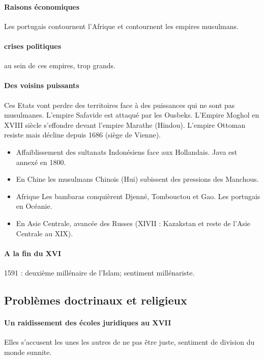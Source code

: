  
 
 \paragraph{Raisons économiques} Les portugais contournent l'Afrique et contournent les empires musulmans.  
 \paragraph{crises politiques} au sein de ces empires, trop grands. 
 \paragraph{Des voisins puissants} Ces Etats vont perdre des territoires face à des puissances qui ne sont pas musulmanes. L'empire Safavide est attaqué par les Ousbeks. L'Empire Moghol en XVIII siècle s'effondre devant l'empire Marathe (Hindou). L'empire Ottoman resiste mais décline depuis 1686 (siège de Vienne). 
 \begin{itemize}
     \item  {Affaiblissement des sultanats Indonésiens} face aux Hollandais. Java est annexé en 1800. 
  \item {En Chine} les musulmans Chinois (Hui) subissent des pressions des Manchous.
   \item  {Afrique} Les bambaras conquièrent Djenné, Tombouctou et Gao. Les portugais en Océanie. 
  \item {En Asie Centrale}, avancée des Russes (XIVII : Kazakstan et reste de l'Asie Centrale au XIX).
 \end{itemize}

 \paragraph{A la fin du XVI} 1591 : deuxième millénaire de l'Islam; sentiment millénariste. 
 
 
 
\subsection{Problèmes doctrinaux et religieux}

\paragraph{Un raidissement des écoles juridiques au XVII}
Elles s'accusent les unes les autres de ne pas être juste, sentiment de division du monde sunnite.


